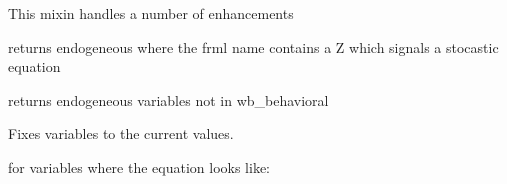 \documentclass[letterpaper,10pt,english]{sphinxmanual}
\begin{document}
\begin{fulllineitems}
\label{\detokenize{index:modelclass.WB_Mixin}}
\pysigstartsignatures
{}
\pysigstopsignatures
\sphinxAtStartPar
This mixin handles a number of enhancements

\begin{fulllineitems}
\label{\detokenize{index:modelclass.WB_Mixin.wb_behavioral}}
\pysigstartsignatures
{}
\pysigstopsignatures
\sphinxAtStartPar
returns endogeneous where the frml name contains a Z which signals a stocastic equation

\end{fulllineitems}


\begin{fulllineitems}
\label{\detokenize{index:modelclass.WB_Mixin.wb_ident}}
\pysigstartsignatures
{}
\pysigstopsignatures
\sphinxAtStartPar
returns endogeneous variables not in wb\_behavioral

\end{fulllineitems}


\begin{fulllineitems}
\label{\detokenize{index:modelclass.WB_Mixin.fix}}
\pysigstartsignatures
{}
\pysigstopsignatures
\sphinxAtStartPar
Fixes variables to the current values.

\sphinxAtStartPar
for variables where the equation looks like:


\end{fulllineitems}
\end{fulllineitems}
\end{document}
